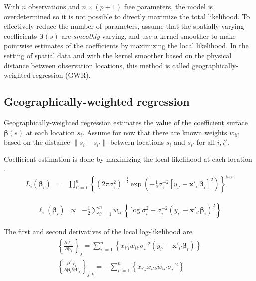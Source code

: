 \documentclass[authoryear, review, 11pt]{elsarticle}
\begin{document}
	With $n$ observations and $n \times (p+1)$ free parameters, the model is overdetermined so it is not possible to directly maximize the total likelihood. To effectively reduce the number of parameters, assume that the spatially-varying coefficients $\bm{\beta}(s)$ are \emph{smoothly} varying, and use a kernel smoother to make pointwise estimates of the coefficients by maximizing the local likelihood. In the setting of spatial data and with the kernel smoother based on the physical distance between observation locations, this method is called geographically-weighted regression (GWR).
		
	\subsection{Geographically-weighted regression}
	Geographically-weighted regression estimates the value of the coefficient surface $\bm{\beta}(s)$ at each location $s_i$. Assume for now that there are known weights $w_{ii'}$ based on the distance $\|s_i  -s_{i'}\|$ between locations $s_i$ and $s_{i'}$ for all $i, i'$.
	
	Coefficient estimation is done by maximizing the local likelihood at each location \citep{Fotheringham:2002}.	
	\begin{eqnarray}
		L_i\left(\bm{\beta}_i\right) &=& \prod_{i'=1}^n \left\{ \left(2 \pi \sigma^2_i  \right)^{-\frac{1}{2}}  \exp\left(-\frac{1}{2} \sigma^{-2}_i  \left[y_{i'} - \bm{x}'_{i'} \bm{\beta}_i \right]^2 \right) \right\} ^ {w_{ii'}}
	\end{eqnarray}
			
	\begin{eqnarray}
		\ell_i\left(\bm{\beta}_i\right) &\propto& - \frac{1}{2} \sum_{i'=1}^n w_{ii'} \left\{ \log{\sigma^2_i}  + \sigma^{-2}_i  \left(y_{i'} - \bm{x}'_{i'} \bm{\beta}_i \right)^2 \right\}
	\end{eqnarray}
	
	The first and second derivatives of the local log-likelihood are
	\begin{eqnarray}
		\left\{\frac{\partial \ell_i}{\partial \bm{\beta}_i} \right\}_j =   \sum_{i'=1}^n \left\{ x_{i'j} w_{ii'} \sigma^{-2}_i \left( y_{i'} - \bm{x}'_{i'} \bm{\beta}_i \right) \right\} \\
		\left\{\frac{\partial^2 \ell_i}{\partial \bm{\beta}_i \partial \bm{\beta}'_i} \right\}_{j,k} = -\sum_{i'=1}^n \left\{ x_{i'j} x_{i'k} w_{ii'} \sigma^{-2}_i \right\}
	\end{eqnarray}
	
\end{document}
